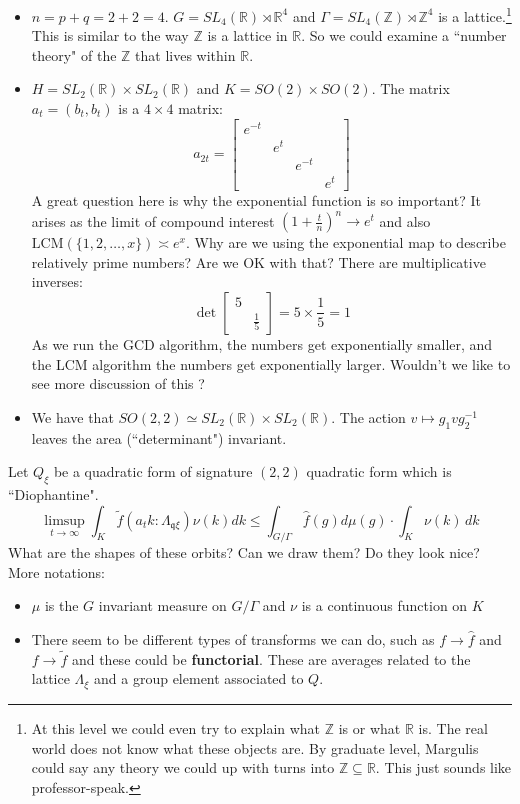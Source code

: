 \documentclass[12pt]{article}
\begin{document}
\begin{itemize}
\item $n = p + q = 2 + 2 = 4$.  $G = SL_4(\mathbb{R}) \rtimes \mathbb{R}^4$ and $\Gamma = SL_4(\mathbb{Z}) \rtimes \mathbb{Z}^4$ is a lattice.\footnote{At this level we could even try to explain what $\mathbb{Z}$ is or what $\mathbb{R}$ is.  The real world does not know what these objects are.  By graduate level, Margulis could say any theory we could up with turns into $\mathbb{Z} \subseteq \mathbb{R}$.  This just sounds like professor-speak.}  This is similar to the way $\mathbb{Z}$ is a lattice in $\mathbb{R}$.  So we could examine a ``number theory" of the $\mathbb{Z}$ that lives within $\mathbb{R}$.  
\item $H = SL_2(\mathbb{R}) \times SL_2(\mathbb{R})$ and $K = SO(2) \times SO(2)$.  The matrix $a_t = (b_t, b_t)$ is a $4 \times 4$ matrix:
$$  a_{2t} =  \left[ \begin{array}{cccc} e^{-t} & & & \\
& e^{t} & & \\
& & e^{-t} & \\
& & & e^{t}  \end{array} \right] $$
A great question here is why the exponential function is so important?  It arises as the limit of compound interest $(1 + \frac{t}{n})^n \to e^t$ and also $ \text{LCM} (\{ 1, 2, \dots, x\}) \asymp e^x $.  Why are we using the exponential map to describe relatively prime numbers?  Are we OK with that? There are multiplicative inverses:
$$   \det \left[ \begin{array}{cc} 5 & \\ & \frac{1}{5} \end{array} \right] = 5 \times \frac{1}{5} = 1 $$
As we run the GCD algorithm, the numbers get exponentially smaller, and the LCM algorithm the numbers get exponentially larger.  Wouldn't we like to see more discussion of this ?
\item We have that $SO(2,2) \simeq SL_2(\mathbb{R}) \times SL_2(\mathbb{R})$.  The action $v \mapsto g_1 v g_2^{-1}$ leaves the area (``determinant") invariant.
\end{itemize}
Let $Q_\xi$ be a quadratic form of signature $(2,2)$ quadratic form which is ``Diophantine".  
$$ \limsup_{t \to \infty} \int_K \tilde{f}(a_t k : \Lambda_{\mathfrak{q}\xi}) \nu(k) dk \leq \int_{G/\Gamma} \hat{f}(g) d\mu(g) \cdot \int_K \nu(k) \, dk  $$
What are the shapes of these orbits? Can we draw them?  Do they look nice? More notations:
\begin{itemize}
\item $\mu$ is the $G$ invariant measure on $ G/ \Gamma$ and $\nu$ is a continuous function on $K$
\item There seem to be different types of transforms we can do, such as $f \to \hat{f}$ and $f \to \tilde{f}$ and these could be \textbf{functorial}.  These are averages related to the lattice $\Lambda_\xi$ and a group element associated to $Q$.
\end{itemize}
\end{document}
